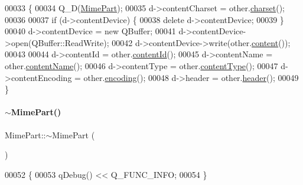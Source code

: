 \begin{DoxyCode}
00033 \{
00034     Q\_D(\hyperlink{class_simple_mail_1_1_mime_part}{MimePart});
00035     d->contentCharset = other.\hyperlink{class_simple_mail_1_1_mime_part_a419b2efe442eb59002ae14c8ab18f94e}{charset}();
00036 
00037     \textcolor{keywordflow}{if} (d->contentDevice) \{
00038         \textcolor{keyword}{delete} d->contentDevice;
00039     \}
00040     d->contentDevice = \textcolor{keyword}{new} QBuffer;
00041     d->contentDevice->open(QBuffer::ReadWrite);
00042     d->contentDevice->write(other.\hyperlink{class_simple_mail_1_1_mime_part_a22fd1bc02bce6c9655d879fd71620bf5}{content}());
00043 
00044     d->contentId = other.\hyperlink{class_simple_mail_1_1_mime_part_a95fbca14bef123a2b65227f4d26622a5}{contentId}();
00045     d->contentName = other.\hyperlink{class_simple_mail_1_1_mime_part_ad16adf3afc9873b4b0636cd3264e2f3e}{contentName}();
00046     d->contentType = other.\hyperlink{class_simple_mail_1_1_mime_part_a3952c9506cc3baf478ecf3a8c204297a}{contentType}();
00047     d->contentEncoding = other.\hyperlink{class_simple_mail_1_1_mime_part_a7e7b2d8b6f32175fbc9d62e5b23ca720}{encoding}();
00048     d->header = other.\hyperlink{class_simple_mail_1_1_mime_part_a87f3646cf7e63664d3d92d087afd76ae}{header}();
00049 \}
\end{DoxyCode}
\mbox{\label{class_simple_mail_1_1_mime_part_adfd3bd58465ffea728a0e057039d42bb}} 
\paragraph{\texorpdfstring{$\sim$\+Mime\+Part()}{~MimePart()}}
{\footnotesize\ttfamily Mime\+Part\+::$\sim$\+Mime\+Part (\begin{DoxyParamCaption}{ }\end{DoxyParamCaption})\hspace{0.3cm}{\ttfamily [virtual]}}


\begin{DoxyCode}
00052 \{
00053     qDebug() << Q\_FUNC\_INFO;
00054 \}
\end{DoxyCode}
\mbox{\label{class_simple_mail_1_1_mime_part_a7b947f679571a86c16fa7015971c1524}} 
